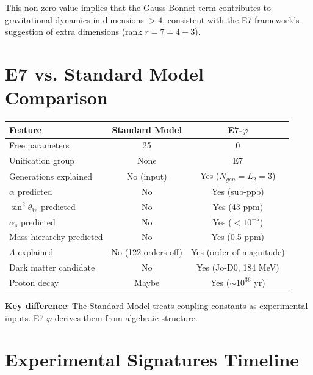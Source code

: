 \documentclass[11pt,a4paper]{article}
\begin{document}
This non-zero value implies that the Gauss-Bonnet term contributes to gravitational dynamics in dimensions $> 4$, consistent with the E7 framework's suggestion of extra dimensions (rank $r = 7 = 4 + 3$).

\section{E7 vs. Standard Model Comparison}

\begin{center}
\begin{tabular}{|l|c|c|}
\hline
\textbf{Feature} & \textbf{Standard Model} & \textbf{E7-$\varphi$} \\
\hline
Free parameters & 25 & 0 \\
Unification group & None & E7 \\
Generations explained & No (input) & Yes ($N_{gen} = L_2 = 3$) \\
$\alpha$ predicted & No & Yes (sub-ppb) \\
$\sin^2\theta_W$ predicted & No & Yes (43 ppm) \\
$\alpha_s$ predicted & No & Yes ($< 10^{-5}$) \\
Mass hierarchy predicted & No & Yes (0.5 ppm) \\
$\Lambda$ explained & No (122 orders off) & Yes (order-of-magnitude) \\
Dark matter candidate & No & Yes (Jo-D0, 184 MeV) \\
Proton decay & Maybe & Yes ($\sim 10^{36}$ yr) \\
\hline
\end{tabular}
\end{center}

\textbf{Key difference}: The Standard Model treats coupling constants as experimental inputs. E7-$\varphi$ derives them from algebraic structure.

\section{Experimental Signatures Timeline}
\end{document}
